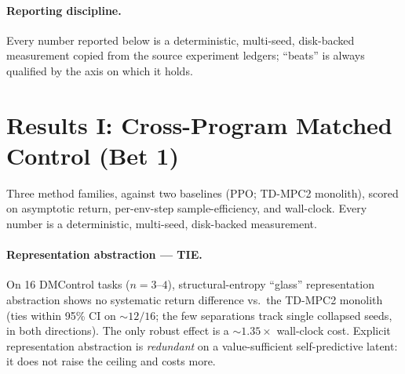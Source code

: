 \documentclass{article}
\begin{document}
\paragraph{Reporting discipline.}
Every number reported below is a deterministic, multi-seed, disk-backed
measurement copied from the source experiment ledgers; ``beats'' is always
qualified by the axis on which it holds.

\section{Results I: Cross-Program Matched Control (Bet 1)}
\label{sec:results-matched}

Three method families, against two baselines (PPO; TD-MPC2 monolith), scored on
asymptotic return, per-env-step sample-efficiency, and wall-clock. Every number
is a deterministic, multi-seed, disk-backed measurement.

\paragraph{Representation abstraction --- TIE.}
On 16 DMControl tasks ($n=3$--$4$), structural-entropy ``glass'' representation
abstraction shows no systematic return difference vs.\ the TD-MPC2 monolith (ties
within 95\% CI on ${\sim}12/16$; the few separations track single collapsed seeds,
in both directions). The only robust effect is a ${\sim}1.35\times$ wall-clock
cost. Explicit representation abstraction is \emph{redundant} on a value-sufficient
self-predictive latent: it does not raise the ceiling and costs more.
\end{document}
